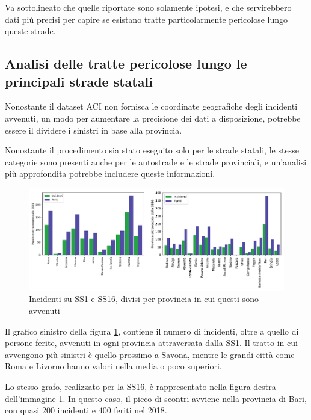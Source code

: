 \documentclass[a4paper,12pt]{report}
\begin{document}
Va sottolineato che quelle riportate sono solamente ipotesi, e che servirebbero 
dati più precisi per capire se esistano tratte particolarmente 
pericolose lungo queste strade. 

\subsection{Analisi delle tratte pericolose lungo le principali strade statali}

Nonostante il dataset ACI non fornisca le coordinate geografiche degli incidenti avvenuti, 
un modo per aumentare la precisione dei dati a disposizione, potrebbe essere il 
dividere i sinistri in base alla provincia. 

Nonostante il procedimento sia stato eseguito solo per le strade statali, le stesse categorie 
sono presenti anche per le autostrade e le strade provinciali, e un'analisi più 
approfondita potrebbe includere queste informazioni. 

\begin{figure}
    \includegraphics[width=\linewidth]{img_unite/tratti_ss1_ss16.png}
    \caption{Incidenti su SS1 e SS16, divisi per provincia in cui questi sono avvenuti}
    \label{fig:incidenti-strade-statali}
\end{figure}

Il grafico sinistro della figura \ref{fig:incidenti-strade-statali}, 
contiene il numero di incidenti, oltre a quello di persone ferite, 
avvenuti in ogni provincia attraversata dalla SS1. 
Il tratto in cui avvengono più sinistri è quello prossimo a Savona, 
mentre le grandi città come 
Roma e Livorno hanno valori nella media o poco superiori. 

Lo stesso grafo, realizzato per la SS16, è rappresentato nella figura destra dell'immagine 
\ref{fig:incidenti-strade-statali}. 
In questo caso, il picco di scontri avviene nella provincia 
di Bari, con quasi $200$ incidenti e $400$ feriti nel 2018. 
\end{document}
